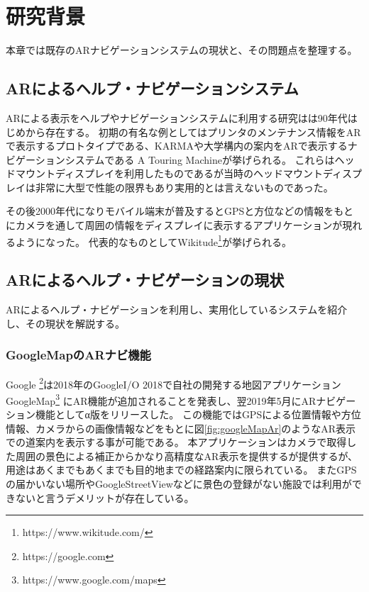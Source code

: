 \chapter{研究背景}
\label{chap:background}

本章では既存のARナビゲーションシステムの現状と、その問題点を整理する。

\newpage


\section{ARによるヘルプ・ナビゲーションシステム}
ARによる表示をヘルプやナビゲーションシステムに利用する研究はは90年代はじめから存在する。
初期の有名な例としてはプリンタのメンテナンス情報をARで表示するプロトタイプである、KARMA\cite{10.1145/159544.159587}や大学構内の案内をARで表示するナビゲーションシステムである A Touring Machine\cite{629922}が挙げられる。
これらはヘッドマウントディスプレイを利用したものであるが当時のヘッドマウントディスプレイは非常に大型で性能の限界もあり実用的とは言えないものであった。

その後2000年代になりモバイル端末が普及するとGPSと方位などの情報をもとにカメラを通して周囲の情報をディスプレイに表示するアプリケーションが現れるようになった。
代表的なものとしてWikitude\footnote{\textsf{https://www.wikitude.com/}}が挙げられる。


\section{ARによるヘルプ・ナビゲーションの現状}
\label{current}
ARによるヘルプ・ナビゲーションを利用し、実用化しているシステムを紹介し、その現状を解説する。

\subsection{GoogleMapのARナビ機能}
Google \footnote{\textsf{https://google.com}}は2018年のGoogleI/O 2018で自社の開発する地図アプリケーションGoogleMap\footnote{\textsf{https://www.google.com/maps}} にAR機能が追加されることを発表し、翌2019年5月にARナビゲーション機能としてα版をリリースした。
この機能ではGPSによる位置情報や方位情報、カメラからの画像情報などをもとに図\ref{fig:googleMapAr}のようなAR表示での道案内を表示する事が可能である。
本アプリケーションはカメラで取得した周囲の景色による補正からかなり高精度なAR表示を提供するが提供するが、用途はあくまでもあくまでも目的地までの経路案内に限られている。
またGPSの届かいない場所やGoogleStreetViewなどに景色の登録がない施設では利用ができないと言うデメリットが存在している。

